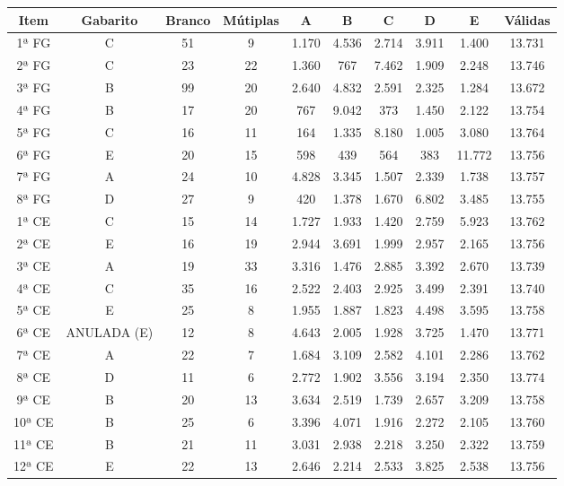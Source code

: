 \documentclass[
  portuguese,
  11pt,
  a4paper,
  DIV=11,
  numbers=noendperiod]{scrreprt}
\begin{document}
\begin{table}
{\fontsize{12.0pt}{14.4pt}\selectfont
\begin{tabular*}{\linewidth}{@{\extracolsep{\fill}}cccccccccc}
\toprule
\textbf{Item} & \textbf{Gabarito} & \textbf{Branco} & \textbf{Mútiplas} & \textbf{A} & \textbf{B} & \textbf{C} & \textbf{D} & \textbf{E} & \textbf{Válidas} \\ 
\midrule\addlinespace[2.5pt]
1ª FG & C & 51 & 9 & 1.170 & 4.536 & 2.714 & 3.911 & 1.400 & 13.731 \\ 
2ª FG & C & 23 & 22 & 1.360 & 767 & 7.462 & 1.909 & 2.248 & 13.746 \\ 
3ª FG & B & 99 & 20 & 2.640 & 4.832 & 2.591 & 2.325 & 1.284 & 13.672 \\ 
4ª FG & B & 17 & 20 & 767 & 9.042 & 373 & 1.450 & 2.122 & 13.754 \\ 
5ª FG & C & 16 & 11 & 164 & 1.335 & 8.180 & 1.005 & 3.080 & 13.764 \\ 
6ª FG & E & 20 & 15 & 598 & 439 & 564 & 383 & 11.772 & 13.756 \\ 
7ª FG & A & 24 & 10 & 4.828 & 3.345 & 1.507 & 2.339 & 1.738 & 13.757 \\ 
8ª FG & D & 27 & 9 & 420 & 1.378 & 1.670 & 6.802 & 3.485 & 13.755 \\ 
1ª CE & C & 15 & 14 & 1.727 & 1.933 & 1.420 & 2.759 & 5.923 & 13.762 \\ 
2ª CE & E & 16 & 19 & 2.944 & 3.691 & 1.999 & 2.957 & 2.165 & 13.756 \\ 
3ª CE & A & 19 & 33 & 3.316 & 1.476 & 2.885 & 3.392 & 2.670 & 13.739 \\ 
4ª CE & C & 35 & 16 & 2.522 & 2.403 & 2.925 & 3.499 & 2.391 & 13.740 \\ 
5ª CE & E & 25 & 8 & 1.955 & 1.887 & 1.823 & 4.498 & 3.595 & 13.758 \\ 
6ª CE & ANULADA (E) & 12 & 8 & 4.643 & 2.005 & 1.928 & 3.725 & 1.470 & 13.771 \\ 
7ª CE & A & 22 & 7 & 1.684 & 3.109 & 2.582 & 4.101 & 2.286 & 13.762 \\ 
8ª CE & D & 11 & 6 & 2.772 & 1.902 & 3.556 & 3.194 & 2.350 & 13.774 \\ 
9ª CE & B & 20 & 13 & 3.634 & 2.519 & 1.739 & 2.657 & 3.209 & 13.758 \\ 
10ª CE & B & 25 & 6 & 3.396 & 4.071 & 1.916 & 2.272 & 2.105 & 13.760 \\ 
11ª CE & B & 21 & 11 & 3.031 & 2.938 & 2.218 & 3.250 & 2.322 & 13.759 \\ 
12ª CE & E & 22 & 13 & 2.646 & 2.214 & 2.533 & 3.825 & 2.538 & 13.756 \\ 

\end{tabular*}}
\end{table}
\end{document}
